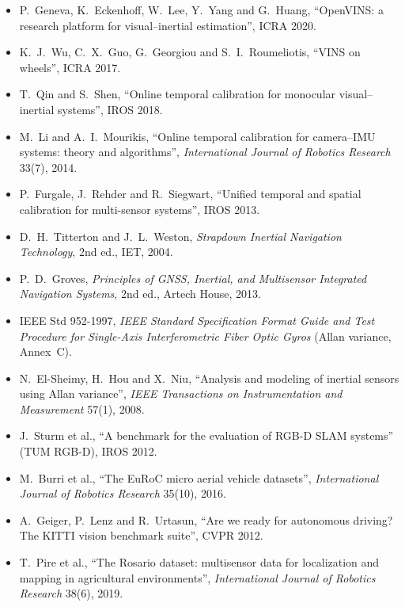 \begin{description}[leftmargin=1.5em,style=nextline,font=\normalfont]
\begin{itemize}[nosep]
{  on Robotics} 37(6), 2021.
\item P.~Geneva, K.~Eckenhoff, W.~Lee, Y.~Yang and G.~Huang, ``OpenVINS:
  a research platform for visual--inertial estimation'', ICRA 2020.
\item K.~J.~Wu, C.~X.~Guo, G.~Georgiou and S.~I.~Roumeliotis, ``VINS on
  wheels'', ICRA 2017.
\item T.~Qin and S.~Shen, ``Online temporal calibration for monocular
  visual--inertial systems'', IROS 2018.
\item M.~Li and A.~I.~Mourikis, ``Online temporal calibration for
  camera--IMU systems: theory and algorithms'', \emph{International
  Journal of Robotics Research} 33(7), 2014.
\item P.~Furgale, J.~Rehder and R.~Siegwart, ``Unified temporal and
  spatial calibration for multi-sensor systems'', IROS 2013.
\end{itemize}
\item[Inertial sensors]
\begin{itemize}[nosep]
\item D.~H.~Titterton and J.~L.~Weston, \emph{Strapdown Inertial
  Navigation Technology}, 2nd ed., IET, 2004.
\item P.~D.~Groves, \emph{Principles of GNSS, Inertial, and
  Multisensor Integrated Navigation Systems}, 2nd ed., Artech House, 2013.
\item IEEE Std 952-1997, \emph{IEEE Standard Specification Format Guide
  and Test Procedure for Single-Axis Interferometric Fiber Optic
  Gyros} (Allan variance, Annex~C).
\item N.~El-Sheimy, H.~Hou and X.~Niu, ``Analysis and modeling of
  inertial sensors using Allan variance'', \emph{IEEE Transactions on
  Instrumentation and Measurement} 57(1), 2008.
\end{itemize}
\item[Datasets]
\begin{itemize}[nosep]
\item J.~Sturm et al., ``A benchmark for the evaluation of RGB-D SLAM
  systems'' (TUM RGB-D), IROS 2012.
\item M.~Burri et al., ``The EuRoC micro aerial vehicle datasets'',
  \emph{International Journal of Robotics Research} 35(10), 2016.
\item A.~Geiger, P.~Lenz and R.~Urtasun, ``Are we ready for autonomous
  driving? The KITTI vision benchmark suite'', CVPR 2012.
\item T.~Pire et al., ``The Rosario dataset: multisensor data for
  localization and mapping in agricultural environments'',
  \emph{International Journal of Robotics Research} 38(6), 2019.
\end{itemize}
\end{description}
